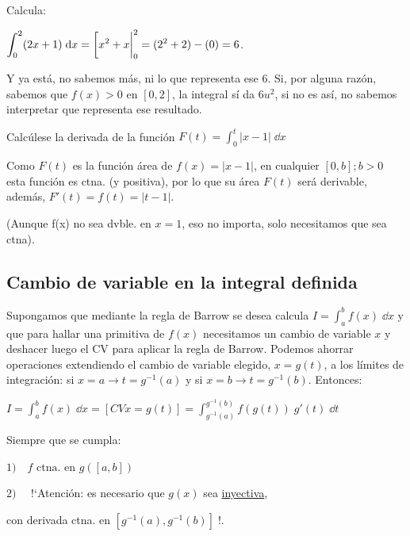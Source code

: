 \begin{ejem} Calcula: 

$\displaystyle \int_0^2 (2x+1)\; \dd x= \eval[ x^2+x|_0^2 = (2^2+2)-(0)=6$.

 Y ya está, no sabemos más, ni lo que representa ese $6$. Si, por alguna razón, sabemos que $f(x)>0$ en $[0,2]$, la integral sí da $6 u^2$, si no es así, no sabemos interpretar que representa ese resultado.
\end{ejem}

\begin{ejem}
Calcúlese la derivada de la función $F(t)=\displaystyle \int_0^t |x-1|\; \dd x$	

Como $F(t)$ es la función área de $f(x)=|x-1|$, en cualquier $[0,b]; b>0$ esta función es ctna. (y positiva), por lo que su área $F(t)$ será derivable, además, $F'(t)=f(t)=|t-1|$.

(Aunque f(x) no sea dvble. en $x=1$, eso no importa, solo necesitamos que sea ctna).
\end{ejem}




\subsection{Cambio de variable en la integral definida}

Supongamos que mediante la regla de Barrow se desea calcula $I=\displaystyle \int_a^b f(x)\; \dd x$ y que para hallar una primitiva de $f(x)$ necesitamos un cambio de variable $x$ y deshacer luego el CV para aplicar la regla de Barrow. Podemos ahorrar operaciones extendiendo el cambio de variable elegido, $x=g(t)$, a los límites de integración: si
$x=a \to t=g^{-1} (a)$ y si 
$x=b \to t=g^{-1} (b)$. Entonces:

\hspace{15mm} $I=\displaystyle \int_a^b f(x)\; \dd x = [CV x=g(t)] = \int_{g^{-1} (a)}^{g^{-1} (b)} f(g(t))\;  g'(t) \; \dd t$
 
 Siempre que se cumpla:
 
 \hspace{20mm} $1) \quad f \text{ ctna. en  }  g([a,b])$
 
 \hspace{20mm} $2) \quad $ !`Atención: es necesario que  $g(x)$ sea \underline{inyectiva}, 
 
  \hspace{20mm} con derivada ctna. en $\left[ g^{-1} (a),g^{-1} (b) \right] \; $!.

